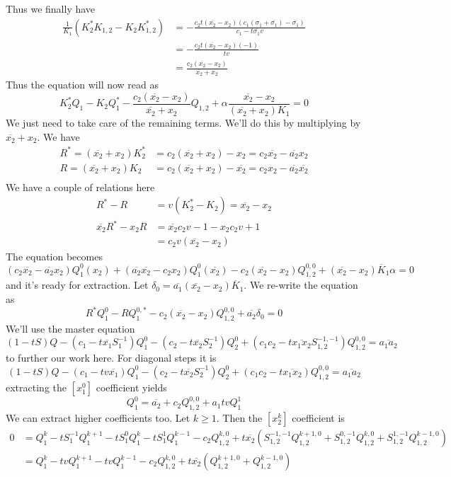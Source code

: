 \documentclass[12pt]{article}
\theoremstyle{definition} \newtheorem{definition}[theorem]{Definition}
\newcommand{\ol}[1]{\overline{#1}}
\newcommand{\Qf}[1]{Q_{1,2}^{#1}}
\newcommand{\Sf}[1]{S_{1,2}^{#1}}
\newcommand{\exx}{\!\!}
\begin{document}
Thus we finally have
\begin{align*}
\frac{1}{K_1}( K_2^\ast K_{1,2}- K_2 K_{1,2}^\ast) 
&= -\frac{c_2t(\ol{x_2}-x_2)(c_1(\sigma_1+\ol{\sigma_1})-\ol{\sigma_1})}{c_1-t\ol{\sigma_1}v}\\
&= -\frac{c_2t(\ol{x_2}-x_2)(-1)}{tv}\\
&= \frac{c_2(\ol{x_2}-x_2)}{\ol{x_2}+x_2}
\end{align*}
Thus the equation will now read as
\[
   K_2^\ast Q_1 - K_2 Q_1^\ast -\frac{c_2(\ol{x_2}-x_2)}{\ol{x_2}+x_2}Q_{1,2}+\alpha\frac{\ol{x_2}-x_2}{(\ol{x_2}+x_2)K_1}= 0
\]
We just need to take care of the remaining terms. We'll do this by multiplying by $\ol{x_2}+x_2$. We have
\begin{align*}
R^\ast \exx= (\ol{x_2}+x_2) K_2^\ast &= c_2(\ol{x_2}+x_2)-x_2 = c_2\ol{x_2}-\ol{a_2}x_2\\
R = (\ol{x_2}+x_2) K_2 &= c_2(\ol{x_2}+x_2)-\ol{x_2} = c_2x_2-\ol{a_2}\ol{x_2}\\
\end{align*}
We have a couple of relations here
\begin{align*}
R^\ast - R &= v(K_2^\ast-K_2) = \ol{x_2}-x_2\\
\ol{x_2}R^\ast - x_2 R &= \ol{x_2}c_2v-1- x_2 c_2v+1 \\
& = c_2v(\ol{x_2}-x_2)
\end{align*}
The equation becomes
\[
(c_2\ol{x_2}-\ol{a_2}x_2)Q_1^0(x_2)+ (\ol{a_2}\ol{x_2}-c_2x_2) Q_1^0(\ol{x_2}) - c_2(\ol{x_2}-x_2)Q_{1,2}^{0,0}+(\ol{x_2}-x_2)\ol{K}_1\alpha = 0
\]
and it's ready for extraction. Let $\delta_0 = \ol{a_1}(\ol{x_2}-x_2)\ol{K}_1$. We re-write the equation as
\[\label{zero-order}
    R^\ast Q_1^0 -R Q_1^{0,\ast} - c_2(\ol{x_2}-x_2)\Qf{0,0} +\ol{a_2}\delta_0 = 0
\]
We'll use the master equation
\[
 (1-tS)Q - (c_1-t\ol{x_1}S_1^{-1}) Q_1^0- (c_2-t\ol{x_2}S_2^{-1}) Q_2^0+ (c_1c_2-t\ol{x_1x_2}S_{1,2}^{-1,-1})Q_{1,2}^{0,0}  = \ol{a_1a_2}
\]
to further our work here. For diagonal steps it is
\[
 (1-tS)Q - (c_1-tv\ol{x_1}) Q_1^0- (c_2-t\ol{x_2}S_2^{-1}) Q_2^0+ (c_1c_2-t\ol{x_1x_2})Q_{1,2}^{0,0}  = \ol{a_1a_2}
\]
extracting the $[x_1^0]$ coefficient yields
\[
   Q_1^0 = \ol{a_2}+c_2\Qf{0,0} + a_1tvQ_1^1
\]
We can extract higher coefficients too. Let $k\geq 1$. Then the $[x_2^k]$ coefficient is
\begin{align*}
0 &= Q_1^k-tS_{1}^{-1}Q_1^{k+1}-tS_1^{0}Q_1^k-tS_1^1Q_1^{k-1}-c_2\Qf{k,0} + t\ol{x_2}(\Sf{-1,-1}\Qf{k+1,0}+\Sf{0,-1}\Qf{k,0}+\Sf{1,-1}\Qf{k-1,0})\\
&=Q_1^k-tvQ_1^{k+1}-tvQ_1^{k-1}-c_2\Qf{k,0} + t\ol{x_2}(\Qf{k+1,0}+\Qf{k-1,0})
\end{align*}
\end{document}
